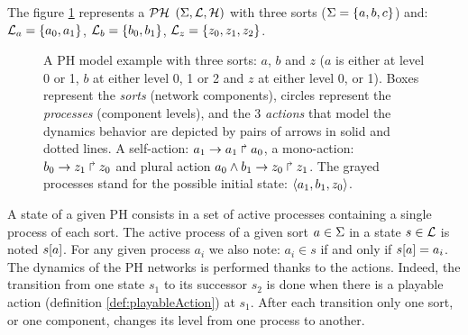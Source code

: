 \begin{example}
The figure \ref{fig:ph} represents a $\mathcal{PH}$ $(\Sigma,\mathcal{L},\mathcal{H})$ with three sorts
($\Sigma = \{a, b, c\}$) and:
$\mathcal{L}_a = \{a_0, a_1\}$,
$\mathcal{L}_b = \{b_0, b_1\}$,
$\mathcal{L}_z = \{z_0, z_1, z_2\}$.
\begin{figure}[ht]
\label{fig:ph} 
\centering
{}
\caption{
A PH model example with three sorts: $a$, $b$ and $z$ ($a$ is either at level 0 or 1, $b$ at either level 0, 1 or 2 and $z$ at either level 0, or 1). Boxes represent the \emph{sorts} (network components), circles represent the \emph{processes} (component levels), and the 3 \emph{actions} that model the dynamics behavior are depicted by pairs of arrows in solid and dotted lines. A self-action:  $a_1\rightarrow a_1\Rsh a_0$, a mono-action:  $b_0\rightarrow z_1\Rsh z_0$ and plural action  $a_0 \wedge b_1\rightarrow z_0\Rsh z_1$.  The grayed processes stand for the possible initial state: $\mbox{$\langle a_1, b_1, z_0 \rangle$}$.
}
\end{figure}
\end{example}
A state of a given PH consists in a set of active processes containing a single process of each sort.
The active process of a given sort $a \in \Sigma$ in a state $s \in \mathcal{L}$
is noted ${s[a]}$.
For any given process $a_i$ we also note: $a_i \in s$ if and only if ${s[a]} = a_i$. The dynamics of the PH networks is performed thanks to the actions. Indeed, the transition from one state $s_1$ to its successor $s_2$ is done when there is a playable action (definition \ref{def:playableAction}) at $s_1$. After each transition only one sort, or one component, changes its level from one process to another.
%

